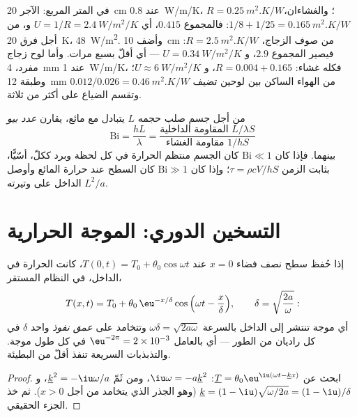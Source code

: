 \begin{example}\label{ex:b2:heat-conduction:wall}
في المتر المربع: الآجر \qty{20}{cm} عند \qty{0.8}{W/m/K}، $R =
\qty{0.25}{m^2.K/W}$؛ والغشاءان، $1/8 + 1/25 = \qty{0.165}{m^2.K/W}$:
فالمجموع $0.415$، أي $U = 1/R = \qty{2.4}{W/m^2/K}$ و، من أجل فرق \qty{20}{K}،
\qty{48}{W/m^2}. وأضف \qty{10}{cm} من صوف الزجاج، $R =
\qty{2.5}{m^2.K/W}$: فيصير المجموع $2.9$، و $U = \qty{0.34}{W/m^2/K}$ ---
أي أقلّ بسبع مرات. وأما لوح زجاج مفرد، \qty{4}{mm} عند \qty{1}{W/m/K}،
فكله غشاء: $R = 0.004 + 0.165$، و $U \approx \qty{6}{W/m^2/K}$؛ وطبقة
\qty{12}{mm} من الهواء الساكن بين لوحين تضيف $0.012/0.026 =
\qty{0.46}{m^2.K/W}$ وتقسم الضياع على أكثر من ثلاثة.
\end{example}

\begin{definition}\label{def:b2:heat-conduction:biot}
من أجل جسم صلب حجمه $L$ يتبادل مع مائع، يقارن \emph{عدد
بيو}
\[
\mathrm{Bi} = \frac{hL}{\lambda} = \frac{\text{المقاومة الداخلية } L/\lambda S}{\text{مقاومة الغشاء } 1/hS}
\]
بينهما. فإذا كان $\mathrm{Bi} \ll 1$ كان الجسم منتظم
الحرارة في كل لحظة وبرد ككلّ، أسّيًّا، بثابت
الزمن $\tau = \rho c V/hS$؛ وإذا كان $\mathrm{Bi} \gg 1$ كان
السطح عند حرارة المائع وأوصل الداخل على
وتيرته $L^2/a$.
\end{definition}

\section{التسخين الدوري: الموجة الحرارية}

\begin{proposition}\label{prop:b2:heat-conduction:wave}
إذا حُفظ سطح نصف فضاء $x = 0$ عند $T(0,t) = T_0 +
\theta_0\cos\omega t$، كانت الحرارة في الداخل، في النظام
المستقر،
\[
T(x,t) = T_0 + \theta_0\,\eu^{-x/\delta}\cos\Big(\omega t - \frac{x}{\delta}\Big),
\qquad \delta = \sqrt{\frac{2a}{\omega}} :
\]
أي موجة تنتشر إلى الداخل بالسرعة $\omega\delta =
\sqrt{2a\omega}$ وتتخامد على \emph{عمق نفوذ} واحد $\delta$
في كل راديان من الطور --- أي بالعامل $\eu^{-2\pi} = 2 \times 10^{-3}$ في كل
طول موجة. والتذبذبات السريعة تنفذ أقلّ من البطيئة.
\end{proposition}

\begin{proof}
ابحث عن $\underline T = \theta_0\eu^{\iu(\omega t - \underline k x)}$:
$\iu\omega = -a\underline k^2$، ومن ثَمّ $\underline k^2 = -\iu\omega/a$،
و $\underline k = (1 - \iu)\sqrt{\omega/2a} = (1 - \iu)/\delta$ (وهو الجذر
الذي يتخامد من أجل $x > 0$). ثم خذ الجزء الحقيقي.
\end{proof}


